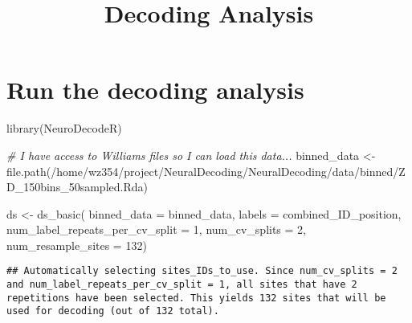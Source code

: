 \documentclass[
]{article}
\title{Decoding Analysis}
\author{}
\date{\vspace{-2.5em}}
\newenvironment{Shaded}{\begin{snugshade}}{\end{snugshade}}
\newcommand{\AttributeTok}[1]{\textcolor[rgb]{0.77,0.63,0.00}{#1}}
\newcommand{\CommentTok}[1]{\textcolor[rgb]{0.56,0.35,0.01}{\textit{#1}}}
\newcommand{\DecValTok}[1]{\textcolor[rgb]{0.00,0.00,0.81}{#1}}
\newcommand{\FunctionTok}[1]{\textcolor[rgb]{0.00,0.00,0.00}{#1}}
\newcommand{\NormalTok}[1]{#1}
\newcommand{\OtherTok}[1]{\textcolor[rgb]{0.56,0.35,0.01}{#1}}
\newcommand{\StringTok}[1]{\textcolor[rgb]{0.31,0.60,0.02}{#1}}
\begin{document}
\maketitle

\hypertarget{run-the-decoding-analysis}{%
\section{Run the decoding analysis}\label{run-the-decoding-analysis}}

\begin{Shaded}
\begin{Highlighting}[]
\FunctionTok{library}\NormalTok{(NeuroDecodeR)}

\CommentTok{\# I have access to William\textquotesingle{}s files so I can load this data...}
\NormalTok{binned\_data }\OtherTok{\textless{}{-}} \FunctionTok{file.path}\NormalTok{(}\StringTok{\textquotesingle{}/home/wz354/project/NeuralDecoding/NeuralDecoding/data/binned/ZD\_150bins\_50sampled.Rda\textquotesingle{}}\NormalTok{) }


\NormalTok{ds }\OtherTok{\textless{}{-}} \FunctionTok{ds\_basic}\NormalTok{(}
    \AttributeTok{binned\_data =}\NormalTok{ binned\_data,}
    \AttributeTok{labels =} \StringTok{\textquotesingle{}combined\_ID\_position\textquotesingle{}}\NormalTok{,}
    \AttributeTok{num\_label\_repeats\_per\_cv\_split =} \DecValTok{1}\NormalTok{,}
    \AttributeTok{num\_cv\_splits =} \DecValTok{2}\NormalTok{,}
    \AttributeTok{num\_resample\_sites =} \DecValTok{132}\NormalTok{) }
\end{Highlighting}
\end{Shaded}

\begin{verbatim}
## Automatically selecting sites_IDs_to_use. Since num_cv_splits = 2 and num_label_repeats_per_cv_split = 1, all sites that have 2 repetitions have been selected. This yields 132 sites that will be used for decoding (out of 132 total).
\end{verbatim}
\end{document}
